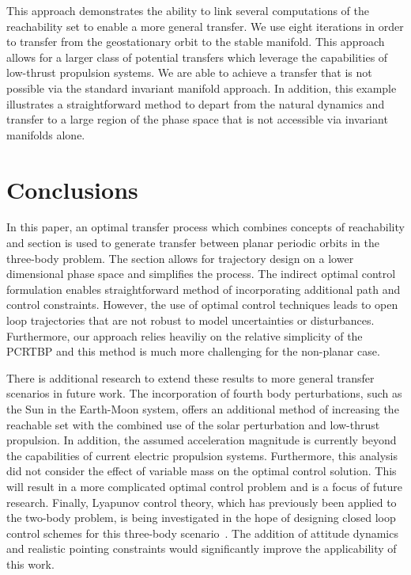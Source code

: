 \documentclass[smallcondensed]{svjour3}
\begin{document}
This approach demonstrates the ability to link several computations of the reachability set to enable a more general transfer.
We use eight iterations in order to transfer from the geostationary orbit to the stable manifold.
This approach allows for a larger class of potential transfers which leverage the capabilities of low-thrust propulsion systems.
We are able to achieve a transfer that is not possible via the standard invariant manifold approach. 
In addition, this example illustrates a straightforward method to depart from the natural dynamics and transfer to a large region of the phase space that is not accessible via invariant manifolds alone.

\section{Conclusions}\label{sec:conclusion}
In this paper, an optimal transfer process which combines concepts of reachability and \Poincare section is used to generate transfer between planar periodic orbits in the three-body problem.
The \Poincare section allows for trajectory design on a lower dimensional phase space and simplifies the process.
The indirect optimal control formulation enables straightforward method of incorporating additional path and control constraints.
However, the use of optimal control techniques leads to open loop trajectories that are not robust to model uncertainties or disturbances.
Furthermore, our approach relies heaviliy on the relative simplicity of the PCRTBP and this method is much more challenging for the non-planar case.

There is additional research to extend these results to more general transfer scenarios in future work.
The incorporation of fourth body perturbations, such as the Sun in the Earth-Moon system, offers an additional method of increasing the reachable set with the combined use of the solar perturbation and low-thrust propulsion.
In addition, the assumed acceleration magnitude is currently beyond the capabilities of current electric propulsion systems.
Furthermore, this analysis did not consider the effect of variable mass on the optimal control solution.
This will result in a more complicated optimal control problem and is a focus of future research.
Finally, Lyapunov control theory, which has previously been applied to the two-body problem, is being investigated in the hope of designing closed loop control schemes for this three-body scenario~\cite{chang2002}.
The addition of attitude dynamics and realistic pointing constraints would significantly improve the applicability of this work.
\end{document}
